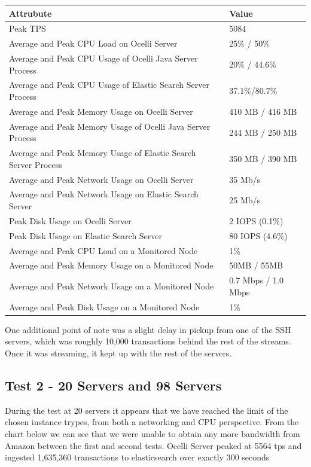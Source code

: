 \documentclass{llncs}
\begin{document}
\begin{flushleft}
    \begin{tabular}{ | l | l |}
    \hline
  Attrubute & Value  \\ \hline
  Peak TPS & 5084  \\ \hline
  Average and Peak CPU Load on Ocelli Server & 25\% / 50\%  \\ \hline
  Average and Peak CPU Usage of Ocelli Java Server Process & 20\% / 44.6\% \\ \hline
 Average and Peak CPU Usage of Elastic Search Server Process & 37.1\%/80.7\%	  \\ \hline
  Average and Peak Memory Usage on Ocelli Server & 410 MB / 416 MB	 \\ \hline
  Average and Peak Memory Usage of Ocelli Java Server Process &	244 MB / 250 MB		 \\ \hline
 Average and Peak Memory Usage of Elastic Search Server Process &	350 MB / 390 MB		 \\ \hline
Average and Peak Network Usage on Ocelli Server &	35 Mb/s 	 \\ \hline
Average and Peak Network Usage on Elastic Search Server & 25 Mb/s 	 \\ \hline
Peak Disk Usage on Ocelli Server &	2 IOPS (0.1\%)		 \\ \hline
Peak Disk Usage on Elastic Search Server &	80 IOPS (4.6\%)		 \\ \hline
Average and Peak CPU Load on a Monitored Node& 	1\% 	 \\ \hline
  Average and Peak Memory Usage on a Monitored Node &	50MB / 55MB	 \\ \hline
Average and Peak Network Usage on a Monitored Node &	0.7 Mbps / 1.0 Mbps		 \\ \hline
  Average and Peak Disk Usage on a Monitored Node &  1\%	\\ 
    \hline
    \end{tabular}
\end{flushleft}

One additional point of note was a slight delay in pickup from one of the SSH servers, which was roughly 10,000 transactions behind the rest of the streams. Once it was streaming, it kept up with the rest of the servers.

\subsection{Test 2 - 20 Servers and 98 Servers}

During the test at 20 servers it appears that we have reached the limit of the chosen instance trypes, from both a networking and CPU perspective. From the chart below we can see that we were unable to obtain any more bandwidth from Amazon between the first and second tests. Ocelli Server peaked at 5564 tps and ingested 1,635,360 transactions to elasticsearch over exactly 300 seconds
\end{document}
